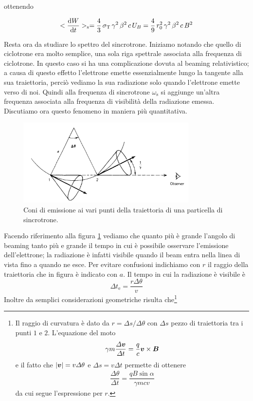 ottenendo 
\begin{EQ}
\begin{equation}
<\dfrac{\mathrm{d} {W}}{\mathrm{d} {t}}>_\mathrm{s} = \dfrac{4}{3}\,\sigma_\mathrm{T} \, \gamma^2 \, \beta^2 \, c \, U_B =  \dfrac{4}{9} \,r_0^2\,\gamma^2\,\beta^2 \,c \,B^2 \label{eq:Sincrotrone5}
\end{equation}
\end{EQ}
Resta ora da studiare lo spettro del sincrotrone. Iniziamo notando che quello di ciclotrone era molto semplice, una sola riga spettrale associata alla frequenza di ciclotrone. In questo caso si ha una complicazione dovuta al beaming relativistico; a causa di questo effetto l'elettrone emette essenzialmente lungo la tangente alla sua traiettoria, perciò vediamo la sua radiazione solo quando l'elettrone emette verso di noi. Quindi alla frequenza di sincrotrone $\omega_\mathrm{s}$ si aggiunge un'altra frequenza associata alla frequenza di visibilità della radiazione emessa. Discutiamo ora questo fenomeno in maniera più quantitativa.
\begin{figure}
\begin{center}
\includegraphics[width=0.8\textwidth]{img/Sincrotrone2}
\caption{Coni di emissione ai vari punti della traiettoria di una particella di sincrotrone.} \label{fig:Sincrotrone2}
\end{center}
\end{figure}
Facendo riferimento alla figura \ref{fig:Sincrotrone2} vediamo che quanto più è grande l'angolo di beaming tanto più e grande il tempo in cui è possibile osservare l'emissione dell'elettrone; la radiazione è infatti visibile quando il beam entra nella linea di vista fino a quando ne esce. Per evitare confusioni indichiamo con $r$ il raggio della traiettoria che in figura è indicato con $a$. Il tempo in cui la radiazione è visibile è
\begin{equation}
\Delta t_\mathrm{e} = \dfrac{r\Delta \theta}{v}
\end{equation}
Inoltre da semplici considerazioni geometriche risulta che\footnote{Il raggio di curvatura è dato da $r=\Delta s / \Delta\theta$ con $\Delta s$ pezzo di traiettoria tra i punti $1$ e $2$. L'equazione del moto 
\begin{align*}
\gamma m \dfrac{\Delta \V{v}}{\Delta t} = \dfrac{q}{c}\vett{v}{B}
\end{align*}
e il fatto che $|\V{v}| = v\Delta\theta$  e $\Delta s = v \Delta t $ permette di ottenere
\begin{align*}
\dfrac{\Delta \theta}{\Delta t} = \dfrac{qB\sin\alpha}{\gamma m c v}
\end{align*}
da cui segue l'espressione per $r$.}
